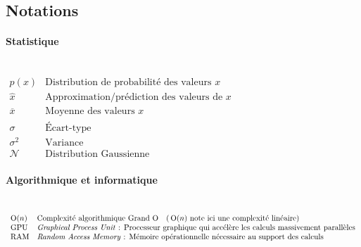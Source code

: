 {}

\vspace*{-1cm}
\begin{flushright}
\section*{\fontsize{20pt}{20pt}\selectfont\textnormal{Notations}}
\end{flushright}
\vspace{2cm}

\fancyhf{}
\lfoot[\fancyplain{}{}]
{\fancyplain{}{}}
\cfoot[\fancyplain{}{\thepage}]
{\fancyplain{}{\thepage}}
\rfoot[\fancyplain{}{}]
{\fancyplain{}{\scriptsize}}


\paragraph{Statistique}\mbox{} \\
$
\begin{array}{ll}
	{p(x)} & {\text {Distribution de probabilité des valeurs } x} \\
	{\hat x} & {\text {Approximation/prédiction des valeurs de } x} \\
	{\overline x} & {\text {Moyenne des valeurs } x} \\
	{\sigma} & {\text {Écart-type}} \\
	{\sigma^{2}} & {\text {Variance}} \\
	{\mathcal{N}} & {\text {Distribution Gaussienne}}
\end{array}
$

\paragraph{Algorithmique et informatique}\mbox{} \\
$
\begin{array}{ll}
	{\operatorname{O}(n)} & {\text {Complexité algorithmique Grand O \ \ (}\operatorname{O}(n)\text { note ici une complexité linéaire)}} \\
	{\text{GPU}} & {\text{\textit{Graphical Process Unit} : Processeur graphique qui accélère les calculs massivement parallèles}} \\
	{\text{RAM}} & {\text{\textit{Random Access Memory} : Mémoire opérationnelle nécessaire au support des calculs}}
\end{array}
$

